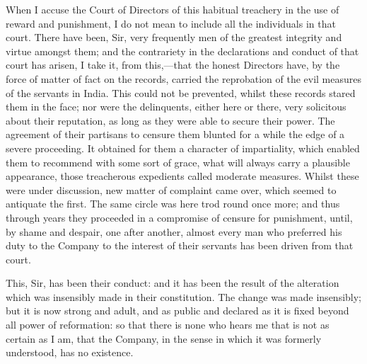 When I accuse the Court of Directors of this habitual treachery in the use of reward and punishment, I do not mean to include all the individuals in that court. There have been, Sir, very frequently men of the greatest integrity and virtue amongst them; and the contrariety in the declarations and conduct of that court has arisen, I take it, from this,—that the honest Directors have, by the force of matter of fact on the records, carried the reprobation of the evil measures of the servants in India. This could not be prevented, whilst these records stared them in the face; nor were the delinquents, either here or there, very solicitous about their reputation, as long as they were able to secure their power. The agreement of their partisans to censure them blunted for a while the edge of a severe proceeding. It obtained for them a character of impartiality, which enabled them to recommend with some sort of grace, what will always carry a plausible appearance, those treacherous expedients called moderate measures. Whilst these were under discussion, new matter of complaint came over, which seemed to antiquate the first. The same circle was here trod round once more; and thus through years they proceeded in a compromise of censure for punishment, until, by shame and despair, one after another, almost every man who preferred his duty to the Company to the interest of their servants has been driven from that court.

This, Sir, has been their conduct: and it has been the result of the alteration which was insensibly made in their constitution. The change was made insensibly; but it is now strong and adult, and as public and declared as it is fixed beyond all power of reformation: so that there is none who hears me that is not as certain as I am, that the Company, in the sense in which it was formerly understood, has no existence.

